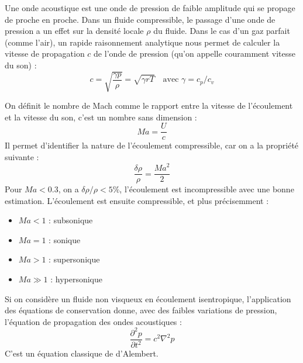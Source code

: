 
Une onde acoustique est une onde de pression de faible amplitude qui se propage de proche en proche. Dans un fluide compressible, le passage d'une onde de pression a un effet sur la densité locale $\rho$ du fluide. Dans le cas d'un gaz parfait (comme l'air), un rapide raisonnement analytique nous permet de calculer la vitesse de propagation $c$ de l'onde de pression (qu'on appelle couramment vitesse du son) :
%
\begin{equation}
    c = \sqrt{\frac{\gamma p}{\rho}} = \sqrt{\gamma r T}
    \quad \text{avec } \gamma = c_p / c_v
\end{equation}

On définit le nombre de Mach comme le rapport entre la vitesse de l'écoulement et la vitesse du son, c'est un nombre sans dimension :
%
\begin{equation}
    Ma = \frac{U}{c}
\end{equation}
%
Il permet d'identifier la nature de l'écoulement compressible, car on a la propriété suivante :
%
\begin{equation}
    \frac{\delta \rho}{\rho} = \frac{{Ma}^2}{2}
\end{equation}
%
Pour $Ma < 0.3$, on a $\delta \rho / \rho < 5\%$, l'écoulement est incompressible avec une bonne estimation. L'écoulement est ensuite compressible, et plus précisemment :
%
\begin{itemize}
    \item $Ma < 1$ : subsonique
    \item $Ma = 1$ : sonique
    \item $Ma > 1$ : supersonique
    \item $Ma \gg 1$ : hypersonique
\end{itemize}

Si on considère un fluide non visqueux en écoulement isentropique, l'application des équations de conservation donne, avec des faibles variations de pression, l'équation de propagation des ondes acoustiques :
%
\begin{equation}
    \frac{\partial^2 p}{\partial t^2} = c^2 \nabla^2 p
\end{equation}
%
C'est un équation classique de d'Alembert.

